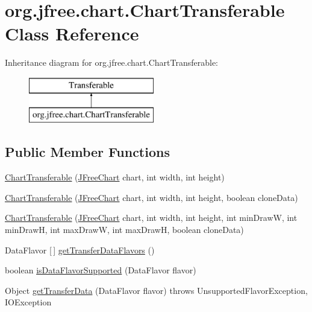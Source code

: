 \hypertarget{classorg_1_1jfree_1_1chart_1_1_chart_transferable}{}\section{org.\+jfree.\+chart.\+Chart\+Transferable Class Reference}
\label{classorg_1_1jfree_1_1chart_1_1_chart_transferable}
Inheritance diagram for org.\+jfree.\+chart.\+Chart\+Transferable\+:\begin{figure}[H]
\begin{center}
\leavevmode
\includegraphics[height=2.000000cm]{classorg_1_1jfree_1_1chart_1_1_chart_transferable}
\end{center}
\end{figure}
\subsection*{Public Member Functions}
\begin{DoxyCompactItemize}
\item 
\mbox{\hyperlink{classorg_1_1jfree_1_1chart_1_1_chart_transferable_a1056fa295ed88a1b78de03e5ee5f6f57}{Chart\+Transferable}} (\mbox{\hyperlink{classorg_1_1jfree_1_1chart_1_1_j_free_chart}{J\+Free\+Chart}} chart, int width, int height)
\item 
\mbox{\hyperlink{classorg_1_1jfree_1_1chart_1_1_chart_transferable_ab0687ab2ad4db362be7b0cec33cc546c}{Chart\+Transferable}} (\mbox{\hyperlink{classorg_1_1jfree_1_1chart_1_1_j_free_chart}{J\+Free\+Chart}} chart, int width, int height, boolean clone\+Data)
\item 
\mbox{\hyperlink{classorg_1_1jfree_1_1chart_1_1_chart_transferable_ade4593d6ece3da0688100dd75bb468d6}{Chart\+Transferable}} (\mbox{\hyperlink{classorg_1_1jfree_1_1chart_1_1_j_free_chart}{J\+Free\+Chart}} chart, int width, int height, int min\+DrawW, int min\+DrawH, int max\+DrawW, int max\+DrawH, boolean clone\+Data)
\item 
Data\+Flavor \mbox{[}$\,$\mbox{]} \mbox{\hyperlink{classorg_1_1jfree_1_1chart_1_1_chart_transferable_a4a61fdacdba70c109a1596ec069ba75f}{get\+Transfer\+Data\+Flavors}} ()
\item 
boolean \mbox{\hyperlink{classorg_1_1jfree_1_1chart_1_1_chart_transferable_a6ae064d2e14caab8bae11e960271e4ba}{is\+Data\+Flavor\+Supported}} (Data\+Flavor flavor)
\item 
Object \mbox{\hyperlink{classorg_1_1jfree_1_1chart_1_1_chart_transferable_a1e434206754f1c95efeed2700cfdd538}{get\+Transfer\+Data}} (Data\+Flavor flavor)  throws Unsupported\+Flavor\+Exception, I\+O\+Exception 
\end{DoxyCompactItemize}


